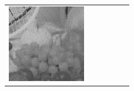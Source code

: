 \documentclass[11pt,a4paper,openright,oneside]{book}
\numberwithin{equation}{section}
\begin{document}
{\begin{figure}[h]
\begin{adjustwidth}{-3cm}{-3cm}
\begin{tabular}{>{\centering\arraybackslash}m{1.5cm} m{2.5cm} m{2.5cm} m{2.5cm} m{2.5cm} m{2.5cm}}
        \includegraphics[width=\linewidth]{media/tnale/AAAfruits-comp5.png} \\
        

\end{tabular}
\end{adjustwidth}
\end{figure}}
\end{document}

